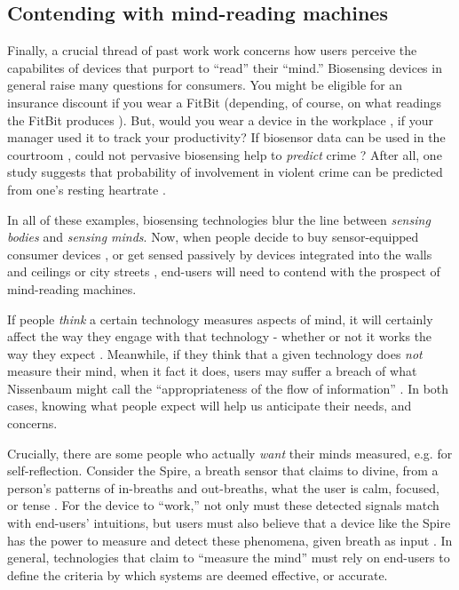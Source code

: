 \documentclass[sigconf]{acmart}
\begin{document}
\subsection{Contending with mind-reading machines}
\label{sec:org463ed13}

Finally, a crucial thread of past work work concerns how users perceive the capabilites of devices that purport to ``read'' their ``mind.''
Biosensing devices in general raise many questions for consumers.
You might be eligible for an insurance discount if you wear a FitBit \cite{Bernard2015} (depending, of course, on what readings the FitBit produces \cite{Brain2015}). 
But, would you wear a device in the workplace \cite{solon2015}, if your manager used it to track your productivity?
If biosensor data can be used in the courtroom \cite{Crawford2014}, could not pervasive biosensing help to \emph{predict} crime \cite{Thompson2011}? 
After all, one study suggests that probability of involvement in violent crime can be predicted from one's resting heartrate \cite{Latvala2015}. 

In all of these examples, biosensing technologies blur the line between \emph{sensing bodies} and \emph{sensing minds}. 
Now, when people decide to buy sensor-equipped consumer devices \cite{Stables2016}, or get sensed passively by devices integrated into the walls and ceilings \cite{Adib2015} or city streets \cite{Thrift2014}, end-users will need to contend with the prospect of mind-reading machines.

If people \emph{think} a certain technology measures aspects of mind, it will certainly affect the way they engage with that technology - whether or not it works the way they expect \cite{Ali2014a}. Meanwhile, if they think that a given technology does \emph{not} measure their mind, when it fact it does, users may suffer a breach of what Nissenbaum might call the ``appropriateness of the flow of information'' \cite{Doyle2011}. In both cases, knowing what people expect will help us anticipate their needs, and concerns.

Crucially, there are some people who actually \emph{want} their minds measured, e.g. for self-reflection. Consider the Spire, a breath sensor that claims to divine, from a person's patterns of in-breaths and out-breaths, what the user is calm, focused, or tense \cite{SpireInc}. 
For the device to ``work,'' not only must these detected signals match with end-users' intuitions, but users must also believe that a device like the Spire has the power to measure and detect these phenomena, given breath as input \cite{Ali2014a}. 
In general, technologies that claim to ``measure the mind'' must rely on end-users to define the criteria by which systems are deemed effective, or accurate. 
\end{document}
